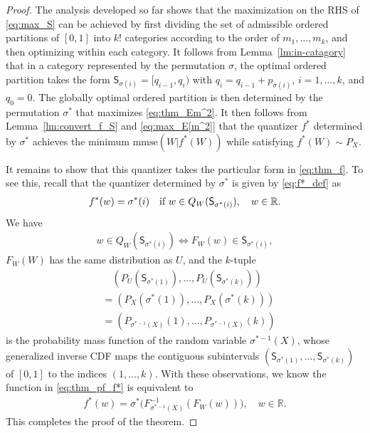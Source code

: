 \documentclass[conference]{IEEEtran}
\newcommand{\R}{\mathbb{R}}
\def\sS{{\mathsf S}}
\begin{document}
\begin{proof}
The analysis developed so far shows that the maximization on the RHS of \eqref{eq:max_S} can be achieved by first dividing the set of admissible ordered partitions of $[0,1]$ into $k!$ categories according to the order of $m_1, \ldots, m_k$, and then optimizing within each category.
It follows from Lemma~\ref{lm:in-catagory} that in a category represented by the permutation $\sigma$, the optimal ordered partition takes the form
$\sS_{\sigma(i)} = [q_{i-1}, q_i)$ with $q_i = q_{i-1} + p_{\sigma(i)}$, $i=1,\ldots,k$,
and $q_0 = 0$. 
The globally optimal ordered partition is then determined by the permutation $\sigma^*$ that maximizes \eqref{eq:thm_Em^2}.
It then follows from Lemma~\ref{lm:convert_f_S}
and \eqref{eq:max_E[m^2]} that the quantizer $f^*$ determined by $\sigma^*$ achieves the minimum $\text{mmse}(W|f^*(W))$ while satisfying $f^*(W)\sim P_X$.

It remains to show that this quantizer takes the particular form in \eqref{eq:thm_f}.
To see this, recall that the quantizer determined by $\sigma^*$ is given by \eqref{eq:f*_def} as
\begin{align}
    f^*(w) = \sigma^*(i) \quad\textnormal{if $w\in Q_W(\sS_{\sigma^*(i)})$} , \quad w\in\R . \label{eq:thm_pf_f*}
\end{align}
We have
\begin{align}
w\in Q_W(\sS_{\sigma^*(i)}) 
\Leftrightarrow F_W(w) \in 
\sS_{\sigma^*(i)} ,
\end{align}
$F_W(W)$ has the same distribution as $U$, and the $k$-tuple 
\begin{align}
& \quad 
(P_U(\sS_{\sigma^*(1)}), \ldots, P_U(\sS_{\sigma^*(k)})) 
 \nonumber \\ 
&= (P_{X}(\sigma^*(1)), \ldots, P_{X}(\sigma^*(k))) \\
&= (P_{\sigma^{*-1}(X)}(1), \ldots, P_{\sigma^{*-1}(X)}(k))
\end{align}
is the probability mass function of the random variable $\sigma^{*-1}(X)$, whose generalized inverse CDF maps the contiguous subintervals
$(\sS_{\sigma^*(1)}, \ldots, \sS_{\sigma^*(k)})$ of $[0,1]$ to the indices $(1,\ldots,k)$.
With these observations, we know the function in \eqref{eq:thm_pf_f*} is equivalent to
\begin{align}
f^*(w) = \sigma^*\big(F_{\sigma^{*-1}(X)}^{-1}(F_W(w))\big), \quad w\in\R .
\end{align}
This completes the proof of the theorem.
\end{proof}
\end{document}
